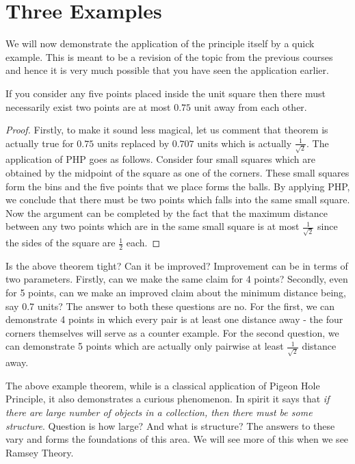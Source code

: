 \section{Three Examples}

We will now demonstrate the application of the principle itself by a quick example. This is meant to be a revision of the topic from the previous courses and hence it is very much possible that you have seen the application earlier.

\begin{theorem}
If you consider any five points placed inside the unit square then there must necessarily exist two points are at most $0.75$ unit away from each other.
\end{theorem}
\begin{proof}
Firstly, to make it sound less magical, let us comment that  theorem is actually true for $0.75$ units replaced by $0.707$ units which is actually $\frac{1}{\sqrt{2}}$. The application of PHP goes as follows. Consider four small squares which are obtained by the midpoint of the square as one of the corners. These small squares form the bins and the five points that we place forms the balls. By applying PHP, we conclude that there must be two points which falls into the same small square. Now the argument can be completed by the fact that the maximum distance between any two points which are in the same small square is at most $\frac{1}{\sqrt{2}}$ since the sides of the square are $\frac{1}{2}$ each.
\end{proof}
\begin{remark}[{\bf Tightness}]
Is the above theorem tight? Can it be improved? Improvement can be in terms of two parameters. Firstly, can we make the same claim for 4 points? Secondly, even for 5 points, can we make an improved claim about the minimum distance being, say 0.7 units? The answer to both these questions are no. For the first, we can demonstrate  4 points in which every pair is at least one distance away - the four corners themselves will serve as a counter example. For the second question, we can demonstrate 5 points which are actually only pairwise at least $\frac{1}{\sqrt{2}}$ distance away. 
\end{remark}

\begin{remark}
The above example theorem, while is a classical application of Pigeon Hole Principle, it also demonstrates a curious phenomenon. In spirit it says that \textit{if there are large number of objects in a collection, then there must be some structure}. Question is how large? And what is structure? The answers to these vary and forms the foundations of this area. We will see more of this when we see Ramsey Theory.
\end{remark}

